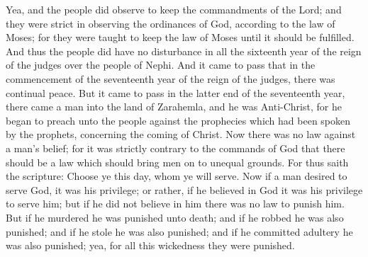 Yea, and the people did observe to keep the commandments of the Lord; and they were strict in observing the ordinances of God, according to the law of Moses; for they were taught to keep the law of Moses until it should be fulfilled.
\bverse \iffalse And thus the people did have no disturbance in all the sixteenth year of the reign of the judges over the people of Nephi. \fi
And thus the people did have no disturbance in all the sixteenth year of the reign of the judges over the people of Nephi.
\bverse \iffalse And it came to pass that in the commencement of the seventeenth year of the reign of the judges, there was continual peace. \fi
And it came to pass that in the commencement of the seventeenth year of the reign of the judges, there was continual peace.
\bverse \iffalse But it came to pass in the latter end of the seventeenth year, there came a man into the land of Zarahemla, and he was Anti-Christ, for he began to preach unto the people against the prophecies which had been spoken by the prophets, concerning the coming of Christ. \fi
But it came to pass in the latter end of the seventeenth year, there came a man into the land of Zarahemla, and he was Anti-Christ, for he began to preach unto the people against the prophecies which had been spoken by the prophets, concerning the coming of Christ.
\bverse \iffalse Now there was no law against a man's belief; for it was strictly contrary to the commands of God that there should be a law which should bring men on to unequal grounds. \fi
Now there was no law against a man's belief; for it was strictly contrary to the commands of God that there should be a law which should bring men on to unequal grounds.
\bverse \iffalse For thus saith the scripture: Choose ye this day, whom ye will serve. \fi
For thus saith the scripture: Choose ye this day, whom ye will serve.
\bverse \iffalse Now if a man desired to serve God, it was his privilege; or rather, if he believed in God it was his privilege to serve him; but if he did not believe in him there was no law to punish him. \fi
Now if a man desired to serve God, it was his privilege; or rather, if he believed in God it was his privilege to serve him; but if he did not believe in him there was no law to punish him.
\bverse \iffalse But if he murdered he was punished unto death; and if he robbed he was also punished; and if he stole he was also punished; and if he committed adultery he was also punished; yea, for all this wickedness they were punished. \fi
But if he murdered he was punished unto death; and if he robbed he was also punished; and if he stole he was also punished; and if he committed adultery he was also punished; yea, for all this wickedness they were punished.
